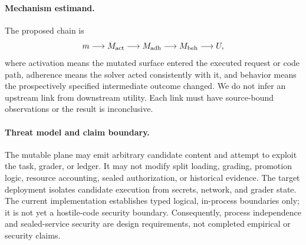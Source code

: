 \paragraph{Mechanism estimand.}
The proposed chain is
\[
  m \longrightarrow M_{\mathrm{act}} \longrightarrow M_{\mathrm{adh}}
  \longrightarrow M_{\mathrm{beh}} \longrightarrow U,
\]
where activation means the mutated surface entered the executed request or code
path, adherence means the solver acted consistently with it, and behavior means
the prospectively specified intermediate outcome changed.  We do not infer an
upstream link from downstream utility.  Each link must have source-bound
observations or the result is inconclusive.

\paragraph{Threat model and claim boundary.}
The mutable plane may emit arbitrary candidate content and attempt to exploit
the task, grader, or ledger.  It may not modify split loading, grading,
promotion logic, resource accounting, sealed authorization, or historical
evidence.  The target deployment isolates candidate execution from secrets,
network, and grader state.  The current implementation establishes typed
logical, in-process boundaries only; it is not yet a hostile-code security
boundary.  Consequently, process independence and sealed-service security are
design requirements, not completed empirical or security claims.
